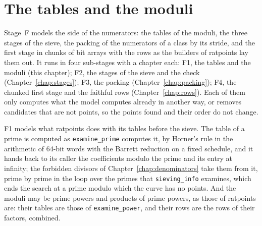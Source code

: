 \chapter{The tables and the moduli}\label{chap:tables}

Stage~F models the side of the numerators: the tables of the moduli, the three stages of the sieve,
the packing of the numerators of a class by its stride, and the first stage in chunks of bit arrays
with the rows as the builders of ratpoints lay them out. It runs in four sub-stages with a chapter
each: F1, the tables and the moduli (this chapter); F2, the stages of the sieve and the check
(Chapter~\ref{chap:stages}); F3, the packing (Chapter~\ref{chap:packing}); F4, the chunked first
stage and the faithful rows (Chapter~\ref{chap:rows}). Each of them only computes what the model
computes already in another way, or removes candidates that are not points, so the points found and
their order do not change.

F1 models what ratpoints does with its tables before the sieve. The table of a prime is computed as
\verb|examine_prime| computes it, by Horner's rule in the arithmetic of 64-bit words with the
Barrett reduction on a fixed schedule, and it hands back to its caller the coefficients modulo the
prime and its entry at infinity; the forbidden divisors of Chapter~\ref{chap:denominators} take them
from it, prime by prime in the loop over the primes that \verb|sieving_info| examines, which ends
the search at a prime modulo which the curve has no points. And the moduli may be prime powers and
products of prime powers, as those of ratpoints are: their tables are those of \verb|examine_power|,
and their rows are the rows of their factors, combined.

